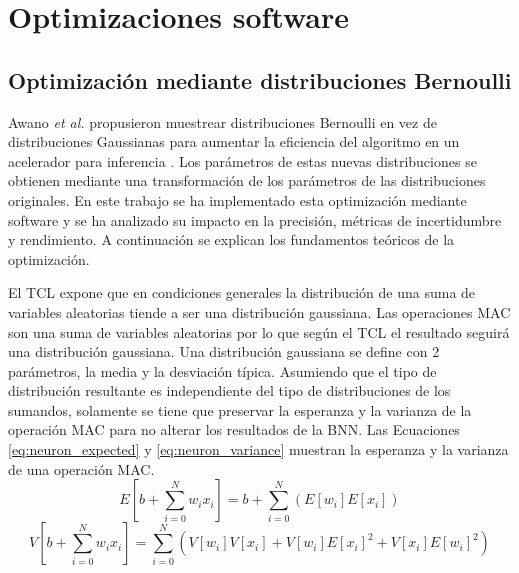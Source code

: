 \chapter{Optimizaciones software} \label{ch:optimizaciones}

\section{Optimización mediante distribuciones Bernoulli}

Awano \emph{et al.} propusieron muestrear distribuciones Bernoulli en vez de distribuciones Gaussianas para aumentar la eficiencia del algoritmo en un acelerador para inferencia \cite{bnn_clt_approx}. Los parámetros de estas nuevas distribuciones se obtienen mediante una transformación de los parámetros de las distribuciones originales. En este trabajo se ha implementado esta optimización mediante software y se ha analizado su impacto en la precisión, métricas de incertidumbre y rendimiento. A continuación se explican los fundamentos teóricos de la optimización.

El TCL expone que en condiciones generales la distribución de una suma de variables aleatorias tiende a ser una distribución gaussiana. Las operaciones MAC son una suma de variables aleatorias por lo que según el TCL el resultado seguirá una distribución gaussiana. Una distribución gaussiana se define con 2 parámetros, la media y la desviación típica. Asumiendo que el tipo de distribución resultante es independiente del tipo de distribuciones de los sumandos, solamente se tiene que preservar la esperanza y la varianza de la operación MAC para no alterar los resultados de la BNN. Las Ecuaciones \ref{eq:neuron_expected}  y \ref{eq:neuron_variance} muestran la esperanza y la varianza de una operación MAC.
\begin{equation} \label{eq:neuron_expected}
E\left[ b + \sum_{i=0}^N w_i x_i \right]  = b + \sum_{i=0}^N ( E[w_i] E[x_i] )
\end{equation}
\begin{equation} \label{eq:neuron_variance}
V\left[ b + \sum_{i=0}^N w_i x_i \right] = \sum_{i=0}^N ( V[w_i]V[x_i] + V[w_i]E[x_i]^2 + V[x_i]E[w_i]^2 )
\end{equation}

